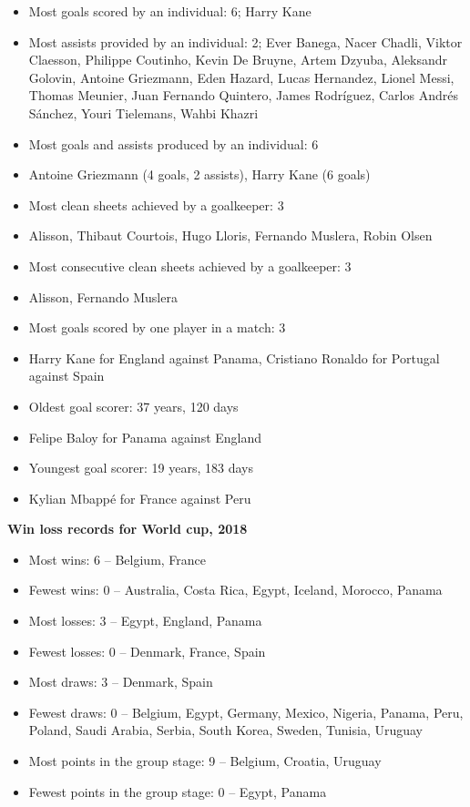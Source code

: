 \documentclass[
  openany]{book}
\providecommand{\tightlist}{%
  \setlength{\itemsep}{0pt}\setlength{\parskip}{0pt}}
\begin{document}
\begin{itemize}
\tightlist
\item
  Most goals scored by an individual: 6; Harry Kane
\item
  Most assists provided by an individual: 2; Ever Banega, Nacer Chadli, Viktor Claesson, Philippe Coutinho, Kevin De Bruyne, Artem Dzyuba, Aleksandr Golovin, Antoine Griezmann, Eden Hazard, Lucas Hernandez, Lionel Messi, Thomas Meunier, Juan Fernando Quintero, James Rodríguez, Carlos Andrés Sánchez, Youri Tielemans, Wahbi Khazri
\item
  Most goals and assists produced by an individual: 6
\item
  Antoine Griezmann (4 goals, 2 assists), Harry Kane (6 goals)
\item
  Most clean sheets achieved by a goalkeeper: 3
\item
  Alisson, Thibaut Courtois, Hugo Lloris, Fernando Muslera, Robin Olsen
\item
  Most consecutive clean sheets achieved by a goalkeeper: 3
\item
  Alisson, Fernando Muslera
\item
  Most goals scored by one player in a match: 3
\item
  Harry Kane for England against Panama, Cristiano Ronaldo for Portugal against Spain
\item
  Oldest goal scorer: 37 years, 120 days
\item
  Felipe Baloy for Panama against England
\item
  Youngest goal scorer: 19 years, 183 days
\item
  Kylian Mbappé for France against Peru
\end{itemize}

\textbf{Win loss records for World cup, 2018}

\begin{itemize}
\tightlist
\item
  Most wins: 6 -- Belgium, France
\item
  Fewest wins: 0 -- Australia, Costa Rica, Egypt, Iceland, Morocco, Panama
\item
  Most losses: 3 -- Egypt, England, Panama
\item
  Fewest losses: 0 -- Denmark, France, Spain
\item
  Most draws: 3 -- Denmark, Spain
\item
  Fewest draws: 0 -- Belgium, Egypt, Germany, Mexico, Nigeria, Panama, Peru, Poland, Saudi Arabia, Serbia, South Korea, Sweden, Tunisia, Uruguay
\item
  Most points in the group stage: 9 -- Belgium, Croatia, Uruguay
\item
  Fewest points in the group stage: 0 -- Egypt, Panama
\end{itemize}
\end{document}
